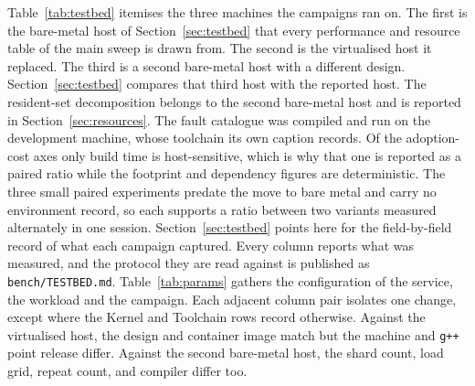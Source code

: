 \documentclass[english,oneside,a4paper,censored,csm,software-track-2020]{HYthesisML}
\begin{document}

\cleardoublepage %

\printbibliography

\backmatter
\begin{appendices}

Table~\ref{tab:testbed} itemises the three machines the campaigns ran on. The first is the
bare-metal host of Section~\ref{sec:testbed} that every performance and resource table of the
main sweep is drawn from. The second is the virtualised host it replaced. The third is a second
bare-metal host with a different design. Section~\ref{sec:testbed} compares that third host
with the reported host. The resident-set decomposition belongs to the
second bare-metal host and is reported in Section~\ref{sec:resources}. The fault catalogue was
compiled and run on the development machine, whose toolchain its own caption records. Of the
adoption-cost axes only build time is host-sensitive, which is why that one is reported as a
paired ratio while the footprint and dependency figures are deterministic. The three small paired
experiments predate the move to bare metal and carry no environment record, so each supports a
ratio between two variants measured alternately in one session. Section~\ref{sec:testbed} points
here for the field-by-field record of what each campaign captured. Every column reports what was
measured, and the protocol they are read against is published as \texttt{bench/TESTBED.md}.
Table~\ref{tab:params} gathers the configuration of the service, the workload and the campaign.
Each adjacent column pair isolates one change, except where the Kernel and Toolchain rows
record otherwise. Against the virtualised host, the design and container image match but the
machine and \texttt{g++} point release differ. Against the second bare-metal host, the shard
count, load grid, repeat count, and compiler differ too.


\end{appendices}
\end{document}
